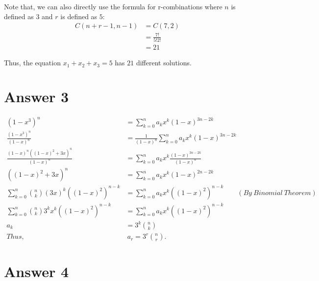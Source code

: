 \documentclass[12pt]{article}
\begin{document}
\qquad Note that, we can also directly use the formula for r-combinations where $n$ is defined as $3$ and $r$ is defined as $5$:
        \begin{equation} 
        \label{eq1}
        \begin{split}
            C(n + r - 1, n - 1) & = C(7, 2) \\
            & = \frac{7!}{5!2!} \\
            & = 21
        \end{split}
        \end{equation}
        
Thus, the equation $x_1 + x_2 + x_3 = 5$ has $21$ different solutions.



\section*{Answer 3}

\begin{equation}
\begin{split}
    (1-x^3)^n & = \sum_{k = 0}^{n} a_k x^ k (1-x)^{3n-2k} \\
    \frac{(1-x^3)^n}{(1-x)^n} & = \frac{1}{(1-x)^n}\sum_{k = 0}^{n} a_k x^ k (1-x)^{3n-2k} \\
    \frac{(1-x)^n((1-x)^2+3x)^n}{(1-x)^n} & = \sum_{k = 0}^{n} a_k x^ k \frac{(1-x)^{3n-2k}}{(1-x)^n} \\
    ((1-x)^2+3x)^n & = \sum_{k = 0}^{n} a_k x^ k (1-x)^{2n-2k} \\
    \sum_{k = 0}^n \binom{n}{k} (3x)^k ((1-x)^2)^{n-k} & = \sum_{k = 0}^{n} a_k x^ k ((1-x)^2)^{n-k} \qquad (By \ Binomial \ Theorem) \\
    \sum_{k = 0}^n \binom{n}{k} 3^k x^k ((1-x)^2)^{n-k} & = \sum_{k = 0}^{n} a_k x^ k ((1-x)^2)^{n-k} \\
    a_k & = 3^k \binom{n}{k}\\
    Thus, & \ a_r = 3^r \binom{n}{r}.
\end{split}
\end{equation}


\section*{Answer 4}
\end{document}
